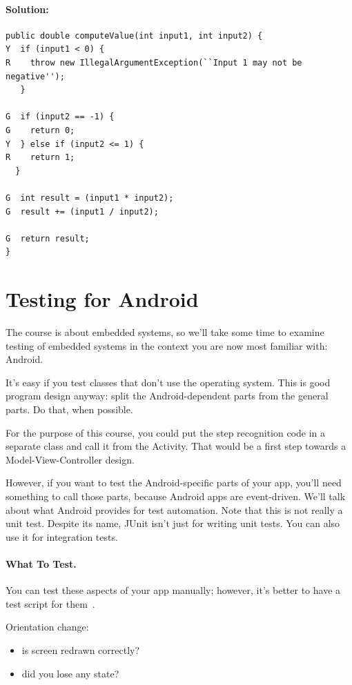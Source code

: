 \paragraph{Solution:}

\begin{verbatim}
public double computeValue(int input1, int input2) {
Y  if (input1 < 0) {
R    throw new IllegalArgumentException(``Input 1 may not be negative'');
   }
  
G  if (input2 == -1) {
G    return 0;
Y  } else if (input2 <= 1) {
R    return 1;
  }
 
G  int result = (input1 * input2); 
G  result += (input1 / input2);
  
G  return result;
}
\end{verbatim}




\section*{Testing for Android}


The course is about embedded systems, so we'll take some time to examine testing of embedded systems in the context you are now most familiar with: Android.


It's easy if you
test classes that don't use the operating system.  This is good program design
anyway: split the Android-dependent parts from the general parts. Do
that, when possible. 

For the purpose of this course, you could put the step recognition
code in a separate class and call it from the Activity. That would be
a first step towards a Model-View-Controller design.

However, if you want to test the Android-specific parts of your app,
you'll need something to call those parts, because Android apps are
event-driven. We'll talk about what Android provides for test automation.
Note that this is not really a unit test. Despite its name, JUnit isn't just
for writing unit tests. You can also use it for integration tests.

\paragraph{What To Test.}
You can test these aspects of your app manually; however, it's better to have a test
script for them~\cite{android:testwhat}.

Orientation change:
\begin{itemize}
\item is screen redrawn correctly?
\item did you lose any state?
\end{itemize}

